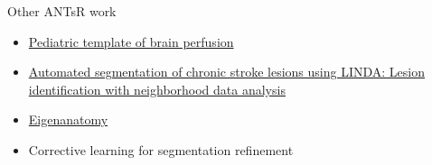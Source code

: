 \documentclass[ignorenonframetext,]{beamer}
\begin{document}
\begin{frame}{Other ANTsR work}

\begin{itemize}
\item
  \href{http://www.nature.com/articles/sdata20153}{Pediatric template of
  brain perfusion}
\item
  \href{http://www.ncbi.nlm.nih.gov/pubmed/26756101}{Automated
  segmentation of chronic stroke lesions using LINDA: Lesion
  identification with neighborhood data analysis}
\item
  \href{http://www.ncbi.nlm.nih.gov/pubmed/25448483}{Eigenanatomy}
\item
  Corrective learning for segmentation refinement
\end{itemize}

\hypertarget{refs}{}

\end{frame}
\end{document}
